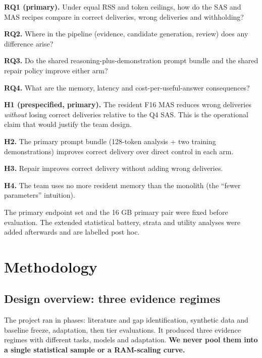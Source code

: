 \documentclass[letterpaper]{article}
\begin{document}
\textbf{RQ1 (primary).} Under equal RSS and token ceilings, how do the SAS and MAS recipes compare in correct deliveries, wrong deliveries and withholding?

\textbf{RQ2.} Where in the pipeline (evidence, candidate generation, review) does any difference arise?

\textbf{RQ3.} Do the shared reasoning-plus-demonstration prompt bundle and the shared repair policy improve either arm?

\textbf{RQ4.} What are the memory, latency and cost-per-useful-answer consequences?

\textbf{H1 (prespecified, primary).} The resident F16 MAS reduces wrong deliveries \emph{without} losing correct deliveries relative to the Q4 SAS. This is the operational claim that would justify the team design.

\textbf{H2.} The primary prompt bundle (128-token analysis + two training demonstrations) improves correct delivery over direct control in each arm.

\textbf{H3.} Repair improves correct delivery without adding wrong deliveries.

\textbf{H4.} The team uses no more resident memory than the monolith (the ``fewer parameters'' intuition).

The primary endpoint set and the 16 GB primary pair were fixed before evaluation. The extended statistical battery, strata and utility analyses were added afterwards and are labelled post hoc.

\section{Methodology}\label{methodology}

\subsection{Design overview: three evidence regimes}\label{design-overview-three-evidence-regimes}

The project ran in phases: literature and gap identification, synthetic data and baseline freeze, adaptation, then tier evaluations. It produced three evidence regimes with different tasks, models and adaptation. \textbf{We never pool them into a single statistical sample or a RAM-scaling curve.}
\end{document}
